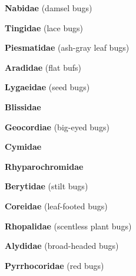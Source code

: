 \documentclass[letterpaper,10pt]{article}
\begin{document}
{%
\makebox[0.6cm]{}  \textbf{Nabidae} (damsel bugs) \par
\makebox[0.6cm]{}  \textbf{Tingidae} (lace bugs) \par
\makebox[0.6cm]{}  \textbf{Piesmatidae} (ash-gray leaf bugs) \par
\makebox[0.6cm]{}  \textbf{Aradidae} (flat bufs) \par
\makebox[0.6cm]{}  \textbf{Lygaeidae} (seed bugs) \par
\makebox[0.6cm]{}  \textbf{Blissidae} \par
\makebox[0.6cm]{}  \textbf{Geocordiae} (big-eyed bugs) \par
\makebox[0.6cm]{}  \textbf{Cymidae} \par
\makebox[0.6cm]{}  \textbf{Rhyparochromidae} \par
\makebox[0.6cm]{}  \textbf{Berytidae} (stilt bugs) \par
\makebox[0.6cm]{}  \textbf{Coreidae} (leaf-footed bugs) \par
\makebox[0.6cm]{}  \textbf{Rhopalidae} (scentless plant bugs) \par
\makebox[0.6cm]{}  \textbf{Alydidae} (broad-headed bugs) \par
\makebox[0.6cm]{}  \textbf{Pyrrhocoridae} (red bugs) \par
}
\end{document}
